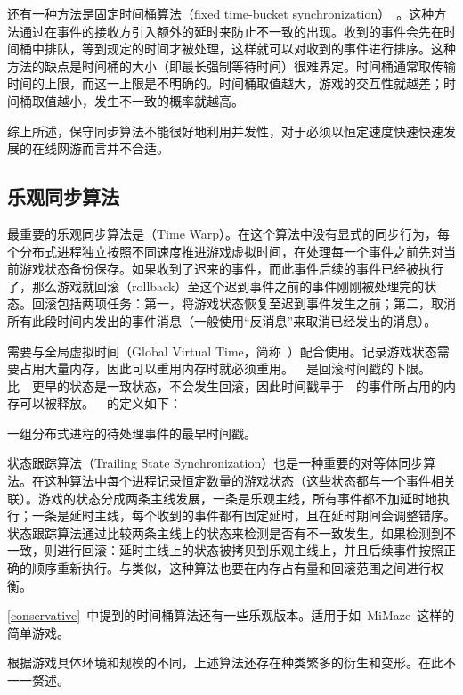 还有一种方法是固定时间桶算法（fixed time-bucket synchronization）~\cite{fixed-bucket}。这种方法通过在事件的接收方引入额外的延时来防止不一致的出现。收到的事件会先在时间桶中排队，等到规定的时间才被处理，这样就可以对收到的事件进行排序。这种方法的缺点是时间桶的大小（即最长强制等待时间）很难界定。时间桶通常取传输时间的上限，而这一上限是不明确的。时间桶取值越大，游戏的交互性就越差；时间桶取值越小，发生不一致的概率就越高。

综上所述，保守同步算法不能很好地利用并发性，对于必须以恒定速度快速快速发展的在线网游而言并不合适。

\subsection{乐观同步算法}
\label{optimistic}

最重要的乐观同步算法是{\timewarp}（Time Warp）。在这个算法中没有显式的同步行为，每个分布式进程独立按照不同速度推进游戏虚拟时间，在处理每一个事件之前先对当前游戏状态备份保存。如果收到了迟来的事件，而此事件后续的事件已经被执行了，那么游戏就回滚（rollback）至这个迟到事件之前的事件刚刚被处理完的状态。回滚包括两项任务：第一，将游戏状态恢复至迟到事件发生之前；第二，取消所有此段时间内发出的事件消息（一般使用“反消息”来取消已经发出的消息）。

{\timewarp}需要与全局虚拟时间（Global Virtual Time，简称~\gvt）配合使用。记录游戏状态需要占用大量内存，因此可以重用内存时就必须重用。~\gvt~是回滚时间戳的下限。比~\gvt~更早的状态是一致状态，不会发生回滚，因此时间戳早于~\gvt~的事件所占用的内存可以被释放。~\gvt~的定义如下：
\begin{zjudefine} 
一组分布式进程的待处理事件的最早时间戳。
\end{zjudefine}

状态跟踪算法（Trailing State Synchronization）也是一种重要的对等体同步算法。在这种算法中每个进程记录恒定数量的游戏状态（这些状态都与一个事件相关联）。游戏的状态分成两条主线发展，一条是乐观主线，所有事件都不加延时地执行；一条是延时主线，每个收到的事件都有固定延时，且在延时期间会调整错序。状态跟踪算法通过比较两条主线上的状态来检测是否有不一致发生。如果检测到不一致，则进行回滚：延时主线上的状态被拷贝到乐观主线上，并且后续事件按照正确的顺序重新执行。与{\timewarp}类似，这种算法也要在内存占有量和回滚范围之间进行权衡。

\ref{conservative}~中提到的时间桶算法还有一些乐观版本。适用于如~MiMaze~这样的简单游戏。

根据游戏具体环境和规模的不同，上述算法还存在种类繁多的衍生和变形。在此不一一赘述。


